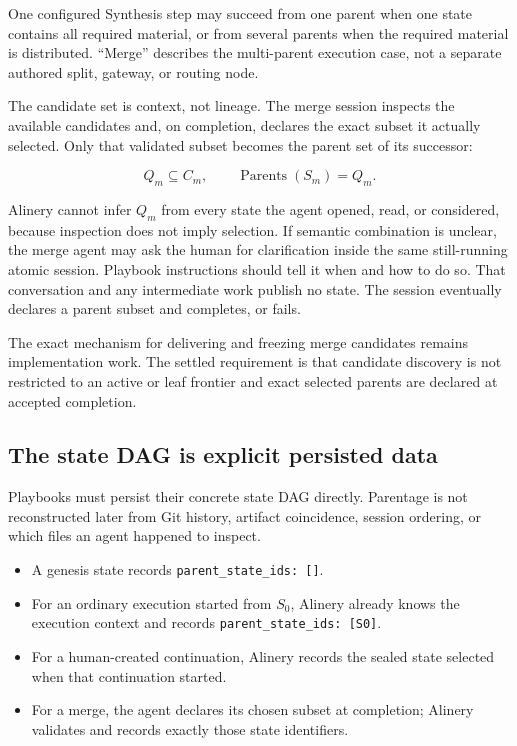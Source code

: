 \documentclass[11pt]{article}
\begin{document}
One configured Synthesis step may succeed from one parent when one state contains all required material, or from several parents when the required material is distributed. ``Merge'' describes the multi-parent execution case, not a separate authored split, gateway, or routing node.

The candidate set is context, not lineage. The merge session inspects the available candidates and, on completion, declares the exact subset it actually selected. Only that validated subset becomes the parent set of its successor:

\begin{equation}
  Q_m \subseteq C_m,
  \qquad
  \operatorname{Parents}(S_m)=Q_m.
\end{equation}

Alinery cannot infer \(Q_m\) from every state the agent opened, read, or considered, because inspection does not imply selection. If semantic combination is unclear, the merge agent may ask the human for clarification inside the same still-running atomic session. Playbook instructions should tell it when and how to do so. That conversation and any intermediate work publish no state. The session eventually declares a parent subset and completes, or fails.

The exact mechanism for delivering and freezing merge candidates remains implementation work. The settled requirement is that candidate discovery is not restricted to an active or leaf frontier and exact selected parents are declared at accepted completion.

\subsection{The state DAG is explicit persisted data}

Playbooks must persist their concrete state DAG directly. Parentage is not reconstructed later from Git history, artifact coincidence, session ordering, or which files an agent happened to inspect.

\begin{itemize}
  \item A genesis state records \texttt{parent\_state\_ids: []}.
  \item For an ordinary execution started from \(S_0\), Alinery already knows the execution context and records \texttt{parent\_state\_ids: [S0]}.
  \item For a human-created continuation, Alinery records the sealed state selected when that continuation started.
  \item For a merge, the agent declares its chosen subset at completion; Alinery validates and records exactly those state identifiers.
\end{itemize}
\end{document}
